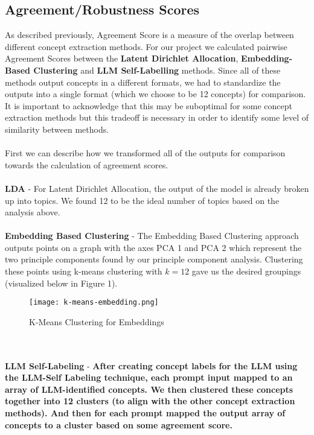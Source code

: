 \documentclass{article}
\begin{document}
\subsection{Agreement/Robustness Scores}
As described previously, Agreement Score is a measure of the overlap between different concept extraction methods. For our project we calculated pairwise Agreement Scores between the \textbf{Latent Dirichlet Allocation}, \textbf{Embedding-Based Clustering} and \textbf{LLM Self-Labelling} methods. Since all of these methods output concepts in a different formats, we had to standardize the outputs into a single format (which we choose to be 12 concepts) for comparison. It is important to acknowledge that this may be suboptimal for some concept extraction methods but this tradeoff is necessary in order to identify some level of similarity between methods.
\\\\
First we can describe how we transformed all of the outputs for comparison towards the calculation of agreement scores.
\\\\
\textbf{LDA} - For Latent Dirichlet Allocation, the output of the model is already broken up into topics. We found 12 to be the ideal number of topics based on the analysis above. 
\\\\
\textbf{Embedding Based Clustering} - The Embedding Based Clustering approach outputs points on a graph with the axes PCA 1 and PCA 2 which represent the two principle components found by our principle component analysis. Clustering these points using k-means clustering with $k = 12$ gave us the desired groupings (visualized below in Figure 1).
\begin{figure}
    \centering
    \texttt{[image: k-means-embedding.png]}
    \caption{K-Means Clustering for Embeddings}
    \label{fig:enter-label}
\end{figure}
\\\\
\textbf{LLM Self-Labeling} - \textbf{After creating concept labels for the LLM using the LLM-Self Labeling technique, each prompt input mapped to an array of LLM-identified concepts. We then clustered these concepts together into 12 clusters (to align with the other concept extraction methods). And then for each prompt mapped the output array of concepts to a cluster based on some agreement score. }
\\\\
\end{document}
